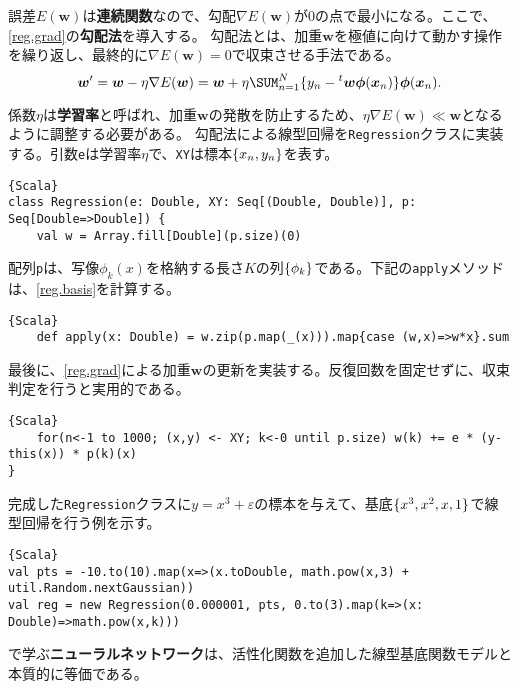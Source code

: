 \documentclass[10pt,a4paper]{book}
\begin{document}
誤差$E(\bm{w})$は\textbf{連続関数}なので、勾配$\nabla E(\bm{w})$が0の点で最小になる。ここで、\eqref{reg.grad}の\textbf{勾配法}を導入する。
勾配法とは、加重$\bm{w}$を極値に向けて動かす操作を繰り返し、最終的に$\nabla E(\bm{w})=0$で収束させる手法である。
%
\begin{equation}
\label{eq:reg.grad}
\bm{w}' = \bm{w} - \eta \nabla E(\bm{w}) = \bm{w} + \eta \sum_{n=1}^N \{y_n - \trans{\bm{w}} \bm{\phi}(\bm{x}_n)\} \bm{\phi}(\bm{x}_n).
\end{equation}

係数$\eta$は\textbf{学習率}と呼ばれ、加重$\bm{w}$の発散を防止するため、$\eta\nabla E(\bm{w})\ll{}\bm{w}$となるように調整する必要がある。
勾配法による線型回帰を\texttt{Regression}クラスに実装する。引数\texttt{e}は学習率$\eta$で、\texttt{XY}は標本$\seq{x_n,y_n}$を表す。

\begin{Verbatim}{Scala}
class Regression(e: Double, XY: Seq[(Double, Double)], p: Seq[Double=>Double]) {
	val w = Array.fill[Double](p.size)(0)
\end{Verbatim}

配列\texttt{p}は、写像$\phi_k(x)$を格納する長さ$K$の列$\seq{\phi_k}$である。下記の\texttt{apply}メソッドは、\eqref{reg.basis}を計算する。

\begin{Verbatim}{Scala}
	def apply(x: Double) = w.zip(p.map(_(x))).map{case (w,x)=>w*x}.sum
\end{Verbatim}

最後に、\eqref{reg.grad}による加重$\bm{w}$の更新を実装する。反復回数を固定せずに、収束判定を行うと実用的である。

\begin{Verbatim}{Scala}
	for(n<-1 to 1000; (x,y) <- XY; k<-0 until p.size) w(k) += e * (y-this(x)) * p(k)(x)
}
\end{Verbatim}

完成した\texttt{Regression}クラスに$y=x^3+\varepsilon$の標本を与えて、基底$\seq{x^3,x^2,x,1}$で線型回帰を行う例を示す。

\begin{Verbatim}{Scala}
val pts = -10.to(10).map(x=>(x.toDouble, math.pow(x,3) + util.Random.nextGaussian))
val reg = new Regression(0.000001, pts, 0.to(3).map(k=>(x: Double)=>math.pow(x,k)))
\end{Verbatim}

で学ぶ\textbf{ニューラルネットワーク}は、活性化関数を追加した線型基底関数モデルと本質的に等価である。
\end{document}
